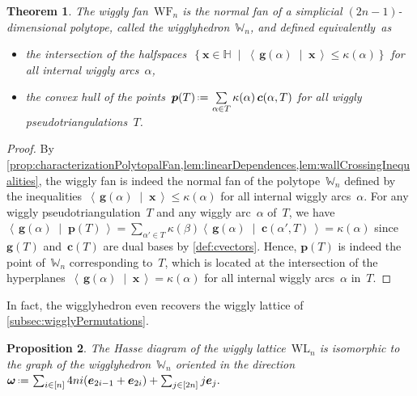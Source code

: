 \documentclass{amsart}
\newtheorem{theorem}{Theorem}%
\newtheorem{proposition}[theorem]{Proposition}
\theoremstyle{definition}
\newcommand{\HH}{\mathbb{H}} %
\renewcommand{\b}[1]{{\boldsymbol{#1}}} %
\newcommand{\set}[2]{\left\{ #1 \;\middle|\; #2 \right\}} %
\newcommand{\dotprod}[2]{\left\langle \, #1 \; \middle| \; #2 \, \right\rangle} %
\newcommand{\eqdef}{\mbox{\,\raisebox{0.2ex}{\scriptsize\ensuremath{\mathrm:}}\ensuremath{=}\,}} %
\newcommand{\darkblue}{\color{darkblue}} %
\newcommand{\defn}[1]{\textsl{\darkblue #1}} %
\newcommand{\polytope}[1]{\mathds{#1}} %
\newcommand{\wigglyLattice}{\mathrm{WL}} %
\newcommand{\wigglyFan}{\mathrm{WF}} %
\newcommand{\wigglyhedron}{\polytope{W}} %
\begin{document}
\begin{theorem}
\label{thm:wigglyhedron}
The wiggly fan~$\wigglyFan_n$ is the normal fan of a simplicial $(2n-1)$-dimensional polytope, called the \defn{wigglyhedron}~$\wigglyhedron_n$, and defined equivalently~as
\begin{itemize}
\item the intersection of the halfspaces~$\set{\b{x} \in \HH}{\dotprod{\b{g}(\alpha)}{\b{x}} \le \kappa(\alpha)}$ for all internal wiggly arcs~$\alpha$,
\item the convex hull of the points~$\b{p}(T) \eqdef \sum\limits_{\alpha \in T} \kappa(\alpha) \, \b{c}(\alpha, T)$ for all wiggly pseudotriangulations~$T$.
\end{itemize}
\end{theorem}

\begin{proof}
By \cref{prop:characterizationPolytopalFan,lem:linearDependences,lem:wallCrossingInequalities}, the wiggly fan is indeed the normal fan of the polytope~$\wigglyhedron_n$ defined by the inequalities~$\dotprod{\b{g}(\alpha)}{\b{x}} \le \kappa(\alpha)$ for all internal wiggly arcs~$\alpha$.
For any wiggly pseudotriangulation~$T$ and any wiggly arc~$\alpha$ of~$T$, we have~$\dotprod{\b{g}(\alpha)}{\b{p}(T)} = \sum_{\alpha' \in T} \kappa(\beta) \dotprod{\b{g}(\alpha)}{\b{c}(\alpha', T)} = \kappa(\alpha)$ since~$\b{g}(T)$ and~$\b{c}(T)$ are dual bases by \cref{def:cvectors}.
Hence, $\b{p}(T)$ is indeed the point of~$\wigglyhedron_n$ corresponding to~$T$, which is located at the intersection of the hyperplanes~$\dotprod{\b{g}(\alpha)}{\b{x}} = \kappa(\alpha)$ for all internal wiggly arcs~$\alpha$ in~$T$.
\end{proof}

In fact, the wigglyhedron even recovers the wiggly lattice of \cref{subsec:wigglyPermutations}.

\begin{proposition}
The Hasse diagram of the wiggly lattice~$\wigglyLattice_n$ is isomorphic to the graph of the wigglyhedron~$\wigglyhedron_n$ oriented in the direction
\(
\b{\omega} \eqdef \sum_{i \in [n]} 4ni (\b{e}_{2i-1} + \b{e}_{2i}) + \sum_{j \in [2n]} j \b{e}_j.
\)
\end{proposition}
\end{document}

